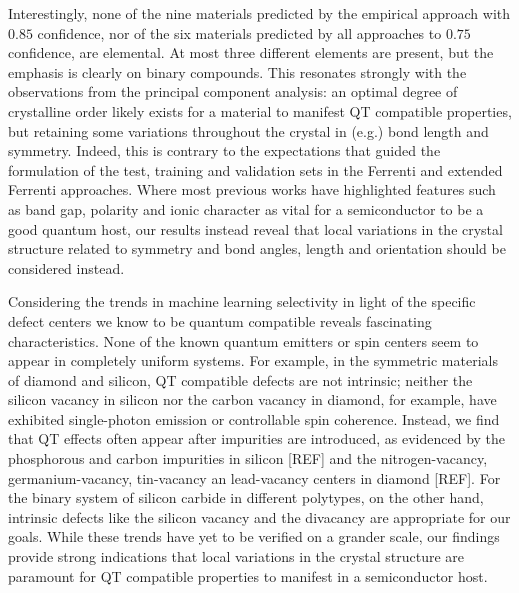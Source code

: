 \documentclass[superscriptaddress,unsortedaddress,
 amsmath,amssymb,
 aps,
]{revtex4-2}
\begin{document}
Interestingly, none of the nine materials predicted by the empirical approach with $0.85$ confidence, nor of the six materials predicted by all approaches to $0.75$ confidence, are elemental. At most three different elements are present, but the emphasis is clearly on binary compounds. This resonates strongly with the observations from the principal component analysis: an optimal degree of crystalline order likely exists for a material to manifest QT compatible properties, but retaining some variations throughout the crystal in (e.g.) bond length and symmetry.  Indeed, this is 
contrary to the expectations that guided the formulation of the test, training and validation sets in the Ferrenti and extended Ferrenti approaches. Where most previous works have highlighted features such as band gap, polarity and ionic character as vital for a semiconductor to be a good quantum host, our results instead reveal that local variations in the crystal structure related to symmetry and bond angles, length and orientation should be considered 
instead. 


Considering the trends in machine learning selectivity in light of the specific defect centers we know to be quantum compatible reveals fascinating characteristics. None of the known quantum emitters or spin centers seem to appear in completely uniform systems. For example, in the symmetric materials of diamond and silicon, QT compatible defects are not intrinsic; neither the silicon vacancy in silicon nor the carbon vacancy in diamond, for example,  have exhibited single-photon emission or controllable spin coherence. Instead, we find that QT effects often appear after impurities are introduced, as evidenced by the phosphorous and carbon impurities in silicon [REF] and the nitrogen-vacancy, germanium-vacancy, tin-vacancy an lead-vacancy centers in diamond [REF]. 
For the binary system of silicon carbide in different polytypes, on the other hand, intrinsic defects like the silicon vacancy and the divacancy are appropriate for our goals. 
While these trends have yet to be verified on a grander scale, our findings provide strong indications that local variations in the crystal structure are paramount for QT  compatible properties to manifest in a semiconductor host. 


\end{document}
